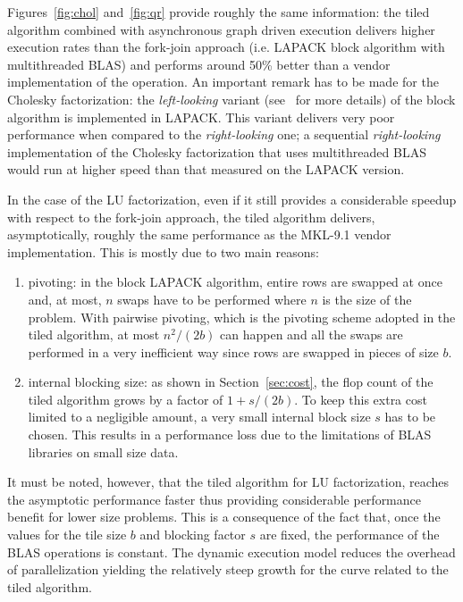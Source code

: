 \documentclass{article}
\begin{document}
Figures~\ref{fig:chol} and~\ref{fig:qr} provide roughly the same
information:
the tiled algorithm combined with asynchronous graph driven execution
delivers higher execution rates than the fork-join approach
(i.e. LAPACK block algorithm with multithreaded BLAS) and performs
around 50\% better than a
vendor implementation of the operation. An important remark has to be
made for the Cholesky factorization: the {\it left-looking} variant
(see~\cite{552704} for more details) of the block algorithm is
implemented in LAPACK. This variant delivers very poor performance
when compared to the {\it right-looking} one; a sequential {\it
  right-looking} implementation of the Cholesky factorization that
uses multithreaded BLAS would run at higher speed than that measured on
the LAPACK version.

In the case of the LU factorization, even if it still provides a
considerable speedup with respect to the fork-join approach, the tiled
algorithm delivers, asymptotically, roughly the same performance as
the MKL-9.1 vendor implementation. This is mostly due to two main
reasons:
\begin{enumerate}
\item pivoting: in the block LAPACK algorithm, entire rows are swapped
  at once and, at most, $n$ swaps have to be performed where $n$ is
  the size of the problem. With pairwise pivoting, which is the
  pivoting scheme adopted in the tiled algorithm, at most $n^2/(2b)$
  can happen and all the swaps are performed in a very inefficient way
  since rows are swapped in pieces of size $b$.
\item internal blocking size: as shown in Section~\ref{sec:cost}, the
  flop count of the tiled algorithm grows by a factor of
  $1+s/(2b)$. To keep this extra cost limited to a negligible amount,
  a very small internal block size $s$ has to be chosen. This results
  in a performance loss due to the limitations of BLAS libraries on
  small size data.
\end{enumerate}

It must be noted, however, that the tiled algorithm for LU
factorization, reaches the asymptotic performance faster thus
providing considerable performance benefit for lower size
problems. This is a consequence of the fact that, once the values for
the tile size $b$ and blocking factor $s$ are fixed, the performance
of the BLAS operations is constant. The dynamic execution model
reduces the overhead of parallelization yielding the relatively steep
growth for the curve related to the tiled algorithm.
\end{document}
